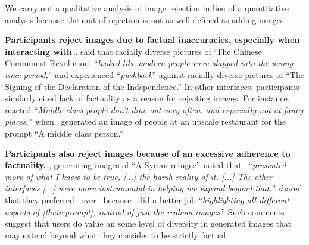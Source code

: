 We carry out a qualitative analysis of image rejection in lieu of a quantitative analysis because the unit of rejection is not as well-defined as adding images.

\textbf{Participants reject images due to factual inaccuracies, especially when interacting with \diverse.}
 said that racially diverse pictures of `The Chinese Communist Revolution' ``\textit{looked like modern people were slapped into the wrong time period,}'' and  experienced ``\textit{pushback}'' against racially diverse pictures of ``The Signing of the Declaration of the Independence.'' 
In other interfaces, participants similarly cited lack of factuality as a reason for rejecting images.
For instance,  reacted ``\textit{Middle class people don't dine out very often, and especially not at fancy places},'' when \baseline~generated an image of people at an upscale restaurant for the prompt ``A middle class person.'' 


\textbf{Participants also reject images because of an excessive adherence to factuality.} 
, generating images of ``A Syrian refugee'' noted that \agonistic~``\textit{presented more of what I know to be true, [...] the harsh reality of it. [...] The other interfaces [...] were more instrumental in helping me expand beyond that.}'' 
 shared that they preferred ~over \agonistic~because ~did a better job ``\textit{highlighting all different aspects of [their prompt], instead of just the realism images}.'' Such comments suggest that users do value an some level of diversity in generated images that may extend beyond what they consider to be strictly factual.

